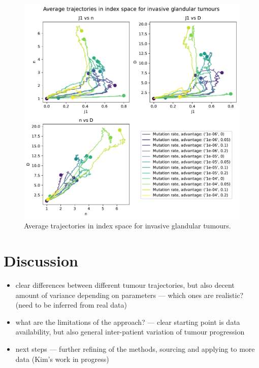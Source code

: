 \begin{figure}
    \centering
    \includegraphics[width=\textwidth]{Chapter_3/figures/indspace-inv-gland.pdf}
    \caption{Average trajectories in index space for invasive glandular tumours.}
    \label{fig:inv-gland-indspace}
\end{figure}


\section{Discussion}
\begin{itemize}
    \item clear differences between different tumour trajectories, but also decent amount of variance depending on parameters --- which ones are realistic? (need to be inferred from real data)
    \item what are the limitations of the approach? --- clear starting point is data availability, but also general inter-patient variation of tumour progression
    \item next steps --- further refining of the methods, sourcing and applying to more data (Kim's work in progress)
\end{itemize}
